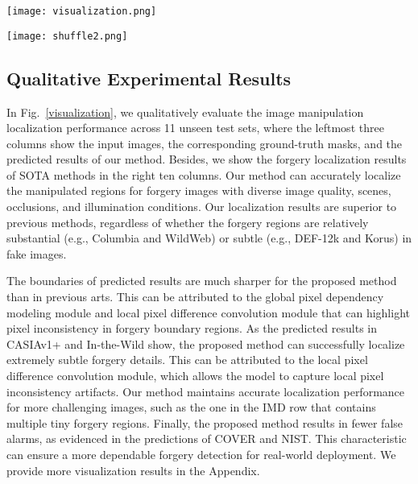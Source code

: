 \documentclass[10pt,journal,compsoc]{IEEEtran}
\begin{document}
\begin{figure*}[ht]
\centering
\texttt{[image:  visualization.png]}
\caption{Forgery localization results on the 11 unseen test sets. The three left columns show the input images, corresponding ground-truth, and the localization results of our method. The right 10 columns present the results of SOTA methods.
}
\label{visualization}
\end{figure*}

\begin{figure*}[ht]
\centering
\texttt{[image:  shuffle2.png]}
\caption{Visualization results on shuffled images. (a) Input unshuffled images. (b) Forgery localization labels. (c) Forgery boundary labels. (d) Our forgery localization results. (e) Our boundary prediction results. (f) MVSS-Net++ forgery localization results. (g) Input shuffled images. (h) Shuffled forgery localization labels. (i) Shuffled forgery boundary labels.  (j) Our forgery localization results on shuffled images. (k) Our boundary prediction results on shuffled images. (l) MVSS-Net++ forgery localization results on shuffled images. 
}
\label{shuffle}
\end{figure*}

\subsection{Qualitative Experimental Results} 
In Fig.~\ref{visualization}, we qualitatively evaluate the image manipulation localization performance across 11 unseen test sets, where the leftmost three columns show the input images, the corresponding ground-truth masks, and the predicted results of our method. Besides, we show the forgery localization results of SOTA methods in the right ten columns. Our method can accurately localize the manipulated regions for forgery images with diverse image quality, scenes, occlusions, and illumination conditions. Our localization results are superior to previous methods, regardless of whether the forgery regions are relatively substantial (e.g., Columbia and WildWeb) or subtle (e.g., DEF-12k and Korus) in fake images.

The boundaries of predicted results are much sharper for the proposed method than in previous arts. This can be attributed to the global pixel dependency modeling module and local pixel difference convolution module that can highlight pixel inconsistency in forgery boundary regions. As the predicted results in CASIAv1+ and In-the-Wild show, the proposed method can successfully localize extremely subtle forgery details. This can be attributed to the local pixel difference convolution module, which allows the model to capture local pixel inconsistency artifacts. Our method maintains accurate localization performance for more challenging images, such as the one in the IMD row that contains multiple tiny forgery regions. Finally, the proposed method results in fewer false alarms, as evidenced in the predictions of COVER and NIST. This characteristic can ensure a more dependable forgery detection for real-world deployment. We provide more visualization results in the Appendix.
\end{document}
